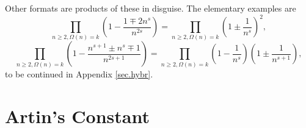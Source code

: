 \documentclass{amsart}
\begin{document}
Other formats are products of these in disguise. The elementary
examples are
\begin{equation}
\prod_{n\ge 2,\Omega(n)=k}
\left(1-\frac{1\mp 2n^s}{n^{2s}}\right)
=
\prod_{n\ge 2,\Omega(n)=k}
\left(1\pm \frac{1}{n^s}\right)^2,
\end{equation}
\begin{equation}
\prod_{n\ge 2,\Omega(n)=k}
\left(1-\frac{n^{s+1}\pm n^s\mp 1}{n^{2s+1}}\right)
=
\prod_{n\ge 2,\Omega(n)=k}
\left(1- \frac{1}{n^s}\right)
\left(1\pm \frac{1}{n^{s+1}}\right),
\end{equation}
to be continued in Appendix \ref{sec.hybr}.




\section{Artin's Constant}
\end{document}
